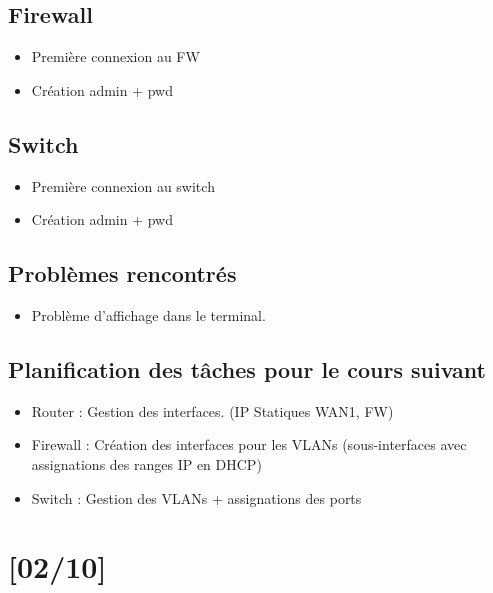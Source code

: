 \documentclass{article}
\begin{document}
\subsection{Firewall}

\begin{itemize}

\item Première connexion au FW
\item Création admin + pwd
\end{itemize}


\subsection{Switch}


\begin{itemize}
\item Première connexion au switch
\item Création admin + pwd
\end{itemize}


\subsection{Problèmes rencontrés}
\begin{itemize}
\item Problème d'affichage dans le terminal.
\end{itemize} 

\subsection{Planification des tâches pour le cours suivant}


\begin{itemize}
\item Router : Gestion des interfaces. (IP Statiques WAN1, FW)
\item Firewall : Création des interfaces pour les VLANs (sous-interfaces avec assignations des ranges IP en DHCP)
\item Switch : Gestion des VLANs + assignations des ports
\end{itemize} 



\newpage

\section{[02/10]}
\end{document}
